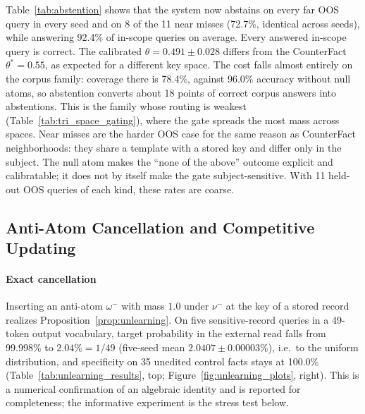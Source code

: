 \documentclass[preprint,12pt]{elsarticle}
\newif\ifmarkchanges %
\newcommand{\rev}[1]{\ifmarkchanges{\color{blue}#1}\else#1\fi} %
\providecommand{\DIFaddend}{} %
\DeclareRobustCommand{\DIFaddend}{\DIFOaddend \let\includegraphics\DIFOincludegraphics} %
\begin{document}
\rev{Table~\ref{tab:abstention} shows that the system now abstains on every far OOS query in every seed and on 8 of the 11 near misses (72.7\%, identical across seeds), while answering 92.4\% of in-scope queries on average. Every answered in-scope query is correct. The calibrated $\theta=0.491\pm0.028$ differs from the CounterFact $\theta^*=0.55$, as expected for a different key space. The cost falls almost entirely on the corpus family: coverage there is 78.4\%, against 96.0\% accuracy without null atoms, so abstention converts about 18 points of correct corpus answers into abstentions. This is the family whose routing is weakest (Table~\ref{tab:tri_space_gating}), where the gate spreads the most mass across spaces. Near misses are the harder OOS case for the same reason as CounterFact neighborhoods: they share a template with a stored key and differ only in the subject. The null atom makes the ``none of the above'' outcome explicit and calibratable; it does not by itself make the gate subject-sensitive. With 11 held-out OOS queries of each kind, these rates are coarse.}

\DIFaddend \subsection{Anti-Atom Cancellation and Competitive Updating}
\label{sec:unlearning}

\paragraph{Exact cancellation}
Inserting an anti-atom $\omega^-$ with mass $1.0$ under $\nu^-$ at the key of a stored record realizes Proposition~\ref{prop:unlearning}. On five sensitive-record queries in a 49-token output vocabulary, target probability in the external read falls from 99.998\% to $2.04\% = 1/49$ (five-seed mean $2.0407\pm0.00003\%$), i.e.\ to the uniform distribution, and specificity on 35 unedited control facts stays at 100.0\% (Table~\ref{tab:unlearning_results}, top; Figure~\ref{fig:unlearning_plots}, right). This is a numerical confirmation of an algebraic identity and is reported for completeness; the informative experiment is the stress test below.
\end{document}
